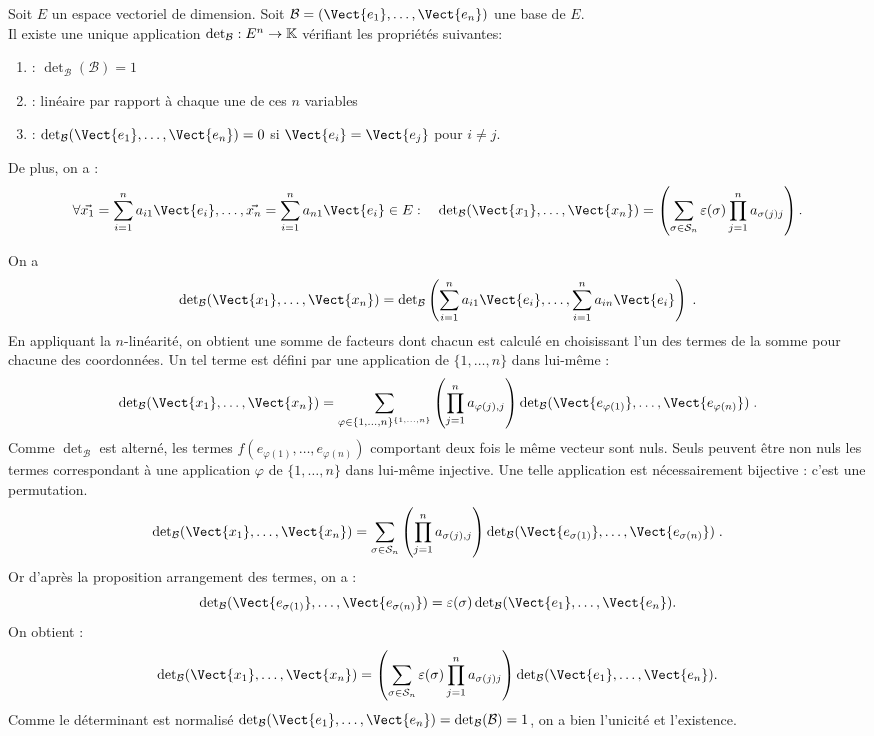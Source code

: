 \documentclass{book}
\begin{document}
\begin{Theoreme}
Soit $E$ un espace vectoriel de dimension. Soit $\mathcal{B}=(\Vect{e_1},\dots,\Vect{e_n})$ une base de $E$.\\
Il existe une unique application $\mathop{\mathrm{det}}\nolimits_\mathcal{B}: E^n\to\mathbb{K}$ vérifiant les propriétés suivantes:
\begin{enumerate}
\item {} : $\det_\mathcal{B}(\mathcal{B}) = 1$
\item {} : linéaire par rapport à chaque une de ces $n$ variables
\item
   : $\det_\mathcal{B}(\Vect{e_1},\dots,\Vect{e_n}) = 0$ si $\Vect{e_i}=\Vect{e_j}$ pour $i\neq j$.
\end{enumerate}
De plus, on a :
$$\forall \vec{x_1}=\sum_{i=1}^n a_{i1}\Vect{e_i},\dots,\vec{x_n}=\sum_{i=1}^n a_{n1}\Vect{e_i}\in E:\quad\det_\mathcal{B}(\Vect{x_1},\dots,\Vect{x_n})=\left(\sum_{\sigma\in{\cal S}_n} \varepsilon (\sigma ) \prod_{j=1}^n a_{\sigma(j)j}\right).
 $$ 
\end{Theoreme}

\begin{Demonstration}
On a 
$$\det_\mathcal{B}(\Vect{x_1},\dots,\Vect{x_n})=
\det_\mathcal{B}\left(\sum_{i=1}^n a_{i1}\Vect{e_i} ,\ldots,\sum_{i=1}^n a_{in}\Vect{e_i}\right)\;.
$$
En appliquant la $n$-linéarité, on obtient une somme de facteurs dont chacun est calculé en choisissant l'un des termes de la somme pour chacune des coordonnées. Un tel terme est défini par une application de $ \{1,\ldots,n\}$ dans lui-même :
$$\det_\mathcal{B}(\Vect{x_1},\dots,\Vect{x_n}) = \sum_{\varphi\in \{1,\ldots,n\}^{\{1,\ldots,n\}}} \left(\prod_{j=1}^n a_{\varphi(j),j}\right)
\det_\mathcal{B}(\Vect{e_{\varphi(1)}},\ldots,\Vect{e_{\varphi(n)}})\;.
$$
Comme $\det_\mathcal{B}$ est alterné, les termes $ f(e_{\varphi(1)},\ldots,e_{\varphi(n)})$ comportant deux fois le même vecteur sont nuls. Seuls peuvent être non nuls les termes correspondant à une application $ \varphi$ de $ \{1,\ldots,n\}$ dans lui-même injective. Une telle application est nécessairement bijective : c'est une permutation.
$$ \det_\mathcal{B}(\Vect{x_1},\dots,\Vect{x_n}) = \sum_{\sigma\in {\cal S}_n}
\left(\prod_{j=1}^n a_{\sigma(j),j}\right)
\det_\mathcal{B}(\Vect{e_{\sigma(1)}},\ldots,\Vect{e_{\sigma(n)}})\;.
$$
Or d'après la proposition arrangement des termes, on a :
$$\det_\mathcal{B}(\Vect{e_{\sigma(1)}},\ldots,\Vect{e_{\sigma(n)}}) = \varepsilon (\sigma ) \det_\mathcal{B}(\Vect{e_{1}},\ldots,\Vect{e_{n}}).$$
On obtient :
$$\det_\mathcal{B}(\Vect{x_1},\dots,\Vect{x_n})=\left(\sum_{\sigma\in{\cal S}_n} \varepsilon (\sigma ) \prod_{j=1}^n a_{\sigma(j)j}\right)\det_\mathcal{B}(\Vect{e_{1}},\ldots,\Vect{e_{n}}).$$
Comme le déterminant est normalisé $\det_\mathcal{B}(\Vect{e_{1}},\ldots,\Vect{e_{n}})=\det_\mathcal{B}(\mathcal{B})=1$, on a bien l'unicité et l'existence.  
\end{Demonstration}
\end{document}
